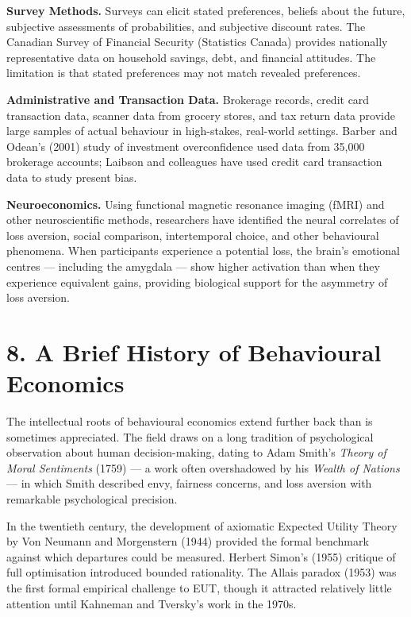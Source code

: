 \documentclass[12pt, letterpaper]{article}
\begin{document}
\textbf{Survey Methods.} Surveys can elicit stated preferences, beliefs about the future, subjective assessments of probabilities, and subjective discount rates. The Canadian Survey of Financial Security (Statistics Canada) provides nationally representative data on household savings, debt, and financial attitudes. The limitation is that stated preferences may not match revealed preferences.

\textbf{Administrative and Transaction Data.} Brokerage records, credit card transaction data, scanner data from grocery stores, and tax return data provide large samples of actual behaviour in high-stakes, real-world settings. Barber and Odean's (2001) study of investment overconfidence used data from 35,000 brokerage accounts; Laibson and colleagues have used credit card transaction data to study present bias.

\textbf{Neuroeconomics.} Using functional magnetic resonance imaging (fMRI) and other neuroscientific methods, researchers have identified the neural correlates of loss aversion, social comparison, intertemporal choice, and other behavioural phenomena. When participants experience a potential loss, the brain's emotional centres --- including the amygdala --- show higher activation than when they experience equivalent gains, providing biological support for the asymmetry of loss aversion.

\medskip


\section{8. A Brief History of Behavioural Economics}


The intellectual roots of behavioural economics extend further back than is sometimes appreciated. The field draws on a long tradition of psychological observation about human decision-making, dating to Adam Smith's \textit{Theory of Moral Sentiments} (1759) --- a work often overshadowed by his \textit{Wealth of Nations} --- in which Smith described envy, fairness concerns, and loss aversion with remarkable psychological precision.

In the twentieth century, the development of axiomatic Expected Utility Theory by Von Neumann and Morgenstern (1944) provided the formal benchmark against which departures could be measured. Herbert Simon's (1955) critique of full optimisation introduced bounded rationality. The Allais paradox (1953) was the first formal empirical challenge to EUT, though it attracted relatively little attention until Kahneman and Tversky's work in the 1970s.
\end{document}
